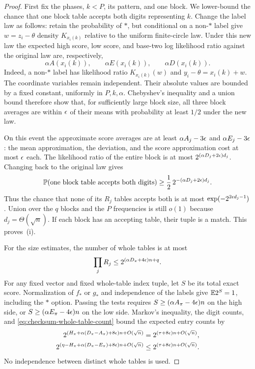 \begin{proof}
First fix the phases, $k<P$, its pattern, and one block.  We lower-bound
the chance that one block table accepts both digits representing $k$.
Change the label law as follows: retain the probability of $*$, but
conditional on a non-$*$ label give $w=z_i-\theta$ density $K_{x_i(k)}$
relative to the uniform finite-circle law.  Under this new law the
expected high score, low score, and base-two log likelihood ratio
against the original law are, respectively,
\[
 \alpha A(x_i(k)),\qquad \alpha E(x_i(k)),\qquad
 \alpha D(x_i(k)).
\]
Indeed, a non-$*$ label has likelihood ratio $K_{x_i(k)}(w)$ and
$y_i-\theta=x_i(k)+w$.  The coordinate variables remain independent.
Their absolute values are bounded by a fixed constant, uniformly in
$P,k,\alpha$.  Chebyshev's inequality and a union bound therefore show
that, for sufficiently large block size, all three block averages
are within $\epsilon$ of their means with probability at least $1/2$
under the new law.

On this event the approximate score averages are at least
$\alpha A_j-3\epsilon$ and $\alpha E_j-3\epsilon$: the mean approximation,
the deviation, and the score approximation cost at most $\epsilon$ each.
The likelihood ratio of the entire block is at most
$2^{(\alpha D_j+2\epsilon)d_j}$.  Changing back to the original law gives
\begin{equation}
 \mathbb P(\text{one block table accepts both digits})
 \ge\frac12\,2^{-(\alpha D_j+2\epsilon)d_j}.
 \label{eq:checksum-coverage-probability}
\end{equation}
Thus the chance that none of its $R_j$ tables accepts both is at most
$\exp(-2^{2\epsilon d_j-1})$.  Union over the $q$ blocks and the $P$
frequencies is still $o(1)$ because $d_j=\Theta(\sqrt n)$.
If each block has an accepting table, their tuple is a match.  This
proves~\textup{(i)}.

For the size estimates, the number of whole tables is at most
\begin{equation}
 \prod_jR_j\le2^{(\alpha D_\pi+4\epsilon)n+q}.
 \label{eq:checksum-whole-table-count}
\end{equation}
For any fixed vector and fixed whole-table index tuple, let $S$ be its
total exact score.  Normalization of $f_*$ or $g_*$ and independence
of the labels give $\mathbb E 2^S=1$, including the $*$ option.
Passing the tests requires $S\ge(\alpha A_\pi-4\epsilon)n$ on the high
side, or $S\ge(\alpha E_\pi-4\epsilon)n$ on the low side.
Markov's inequality, the digit counts, and
\eqref{eq:checksum-whole-table-count} bound the expected entry counts by
\begin{align*}
 2^{(H_\pi+\alpha(D_\pi-A_\pi)+8\epsilon)n+O(\sqrt n)}
   &=2^{(\tau+8\epsilon)n+O(\sqrt n)},\\
 2^{(\eta-H_\pi+\alpha(D_\pi-E_\pi)+8\epsilon)n+O(\sqrt n)}
   &\le2^{(\tau+8\epsilon)n+O(\sqrt n)}.
\end{align*}
No independence between distinct whole tables is used.


\end{proof}

